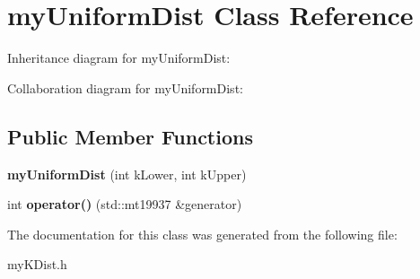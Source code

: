 \hypertarget{classmyUniformDist}{\section{my\+Uniform\+Dist Class Reference}
\label{classmyUniformDist}
}


Inheritance diagram for my\+Uniform\+Dist\+:


Collaboration diagram for my\+Uniform\+Dist\+:
\subsection*{Public Member Functions}
\begin{DoxyCompactItemize}
\item 
\hypertarget{classmyUniformDist_a71e74211348cf40cce59cdb4b0a60a53}{{\bfseries my\+Uniform\+Dist} (int k\+Lower, int k\+Upper)}\label{classmyUniformDist_a71e74211348cf40cce59cdb4b0a60a53}

\item 
\hypertarget{classmyUniformDist_ac26bc634710c32b7bb2a5a46aff38106}{int {\bfseries operator()} (std\+::mt19937 \&generator)}\label{classmyUniformDist_ac26bc634710c32b7bb2a5a46aff38106}

\end{DoxyCompactItemize}


The documentation for this class was generated from the following file\+:\begin{DoxyCompactItemize}
\item 
my\+K\+Dist.\+h\end{DoxyCompactItemize}
